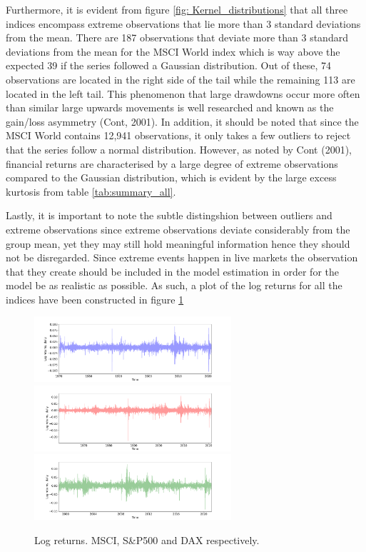 Furthermore, it is evident from figure \ref{fig: Kernel_distributions} that all three indices encompass extreme observations that lie more than 3 standard deviations from the mean. There are 187 observations that deviate more than 3 standard deviations from the mean for the MSCI World index which is way above the expected 39 if the series followed a Gaussian distribution. Out of these, 74 observations are located in the right side of the tail while the remaining 113 are located in the left tail. This phenomenon that large drawdowns occur more often than similar large upwards movements is well researched and known as the gain/loss asymmetry (Cont, 2001). In addition, it should be noted that since the MSCI World contains 12,941 observations, it only takes a few outliers to reject that the series follow a normal distribution. However, as noted by Cont (2001), financial returns are characterised by a large degree of extreme observations compared to the Gaussian distribution, which is evident by the large excess kurtosis from table \ref{tab:summary_all}.

Lastly, it is important to note the subtle distingshion between outliers and extreme observations since extreme observations deviate considerably from the group mean, yet they may still hold meaningful information hence they should not be disregarded.
Since extreme events happen in live markets the observation that they create should be included in the model estimation in order for the model be as realistic as possible. As such, a plot of the log returns for all the indices have been constructed in figure \ref{fig: log_returns_all_indices}

\begin{figure}[H] 
    \centering
    \includegraphics[width=0.65\textwidth]{analysis/data_description/images/MSCI_log_returns.png}
    \includegraphics[width=0.65\textwidth]{analysis/data_description/images/SP500_log_returns.png}
    \includegraphics[width=0.65\textwidth]{analysis/data_description/images/DAX_log_returns.png}
    \caption{Log returns. MSCI, S\&P500 and DAX respectively.}
    \label{fig: log_returns_all_indices}
\end{figure}

